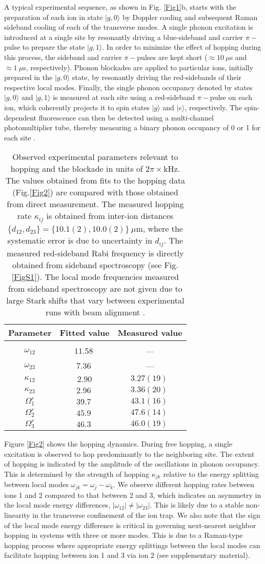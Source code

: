 \documentclass[groupaddress,9pt,twocolumn,superscriptaddress, aps, prl]{revtex4-1}
\newcommand{\ket}[1]{|#1\rangle}
\newcommand{\TableOne}{
\begin{table}
\begin{center}
\begin{tabular} { c c c }
Parameter\hspace{2 mm} & Fitted value\hspace{2 mm} & Measured value\\[0.5ex]
\hline
\\
 $\omega_{12}$ & $11.58\:$ & --- \\ [0.5ex]
 $\omega_{23} $ & $7.36\:$ & ---  \\  [0.5ex]
 $\kappa_{12}$ & $2.90$\: & $3.27(19)\:$   \\ [0.5ex]
 $\kappa_{23}$ & $2.96\:$ & $3.36(20)\:$\\ [1ex]
 $\Omega_1^r$ & $39.7\:$& $43.1(16)\:$\\[1ex]
 $\Omega_2^r$ & $45.9\:$& $47.6(14)\:$\\[1ex]
 $\Omega_3^r$ & $46.3\:$& $46.0(19)\:$\\[1ex] 
 \hline
\end{tabular}
\end{center}
\caption{ Observed experimental parameters relevant to hopping and the blockade in units of $ 2\pi\times$kHz. The values obtained from fits to the hopping data (Fig.\ref{Fig2}) are compared with those obtained from direct measurement. The measured hopping rate $\kappa_{ij}$ is obtained from inter-ion distances $\{d_{12}, d_{23}\}=\{10.1(2),10.0(2)\}\:\mu$m, where the systematic error is due to uncertainty in $d_{ij}$. The measured red-sideband Rabi frequency is directly obtained from sideband spectroscopy (see Fig.\ref{FigS1}). The local mode frequencies measured from sideband spectroscopy are not given due to large Stark shifts that vary between experimental runs with beam alignment \cite{Lee2016}.}
\label{Tab1}
\end{table}
}
\begin{document}
A typical experimental sequence, as shown in Fig. \ref{Fig1}b, starts with the preparation of each ion in state $\ket{g,0}$ by Doppler cooling and subsequent Raman sideband cooling of each of the transverse modes. A single phonon excitation is introduced at a single site by resonantly driving a blue-sideband and carrier $\pi-$pulse to prepare the state $\ket{g,1}$. In order to minimize the effect of hopping during this process, the sideband and carrier $\pi-$pulses are kept short ($\approx10\:\mu$s and $\approx 1\:\mu$s, respectively). Phonon blockades are applied to particular ions, initially prepared in the $\ket{g,0}$ state, by resonantly driving the red-sidebands of their respective local modes. Finally, the single phonon occupancy denoted by states $\ket{g,0}$ and $\ket{g,1}$ is measured at each site using a red-sideband $\pi-$pulse on each ion, which coherently projects it to spin states $\ket{g}$ and $\ket{e}$, respectively. The spin-dependent fluorescence can then be detected using a multi-channel photomultiplier tube, thereby measuring a binary phonon occupancy of 0 or 1 for each site \cite{Olmschenk2007, Debnath2016}.

\TableOne
Figure \ref{Fig2} shows the hopping dynamics. During free hopping, a single excitation is observed to hop predominantly to the neighboring site. The extent of hopping is indicated by the amplitude of the oscillations in phonon occupancy. This is determined by the strength of hopping $\kappa_{jk}$ relative to the energy splitting between local modes $\omega_{jk}=\omega_j-\omega_k$. We observe different hopping rates between ions 1 and 2 compared to that between 2 and 3, which indicates an asymmetry in the local mode energy differences, $|\omega_{12}|\ne|\omega_{23}|$. This is likely due to a stable non-linearity in the transverse confinement of the ion trap. We also note that the sign of the local mode energy difference is critical in governing next-nearest neighbor hopping in systems with three or more modes. This is due to a Raman-type hopping process where appropriate energy splittings between the local modes can facilitate hopping between ion 1 and 3 via ion 2 (see supplementary material).
\end{document}
